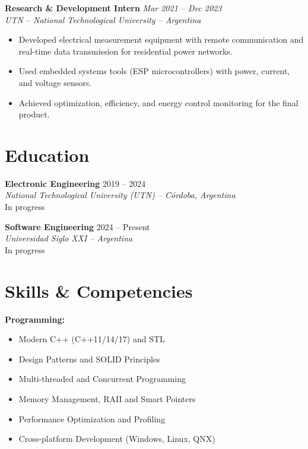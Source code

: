 \documentclass[11pt,a4paper]{article}
\newcommand{\resumeItem}[1]{\item #1}
\newcommand{\jobentry}[3]{%
    \noindent\textbf{#1} \hfill \textit{#2}\\
    \textit{#3}
}
\begin{document}
\jobentry{Research \& Development Intern}{Mar 2021 -- Dec 2023}{UTN -- National Technological University -- Argentina}
\begin{itemize}[leftmargin=*, nosep, topsep=4pt]
    \resumeItem{Developed electrical measurement equipment with remote communication and real-time data transmission for residential power networks.}
    \resumeItem{Used embedded systems tools (ESP microcontrollers) with power, current, and voltage sensors.}
    \resumeItem{Achieved optimization, efficiency, and energy control monitoring for the final product.}
\end{itemize}

\section{Education}

\noindent\textbf{Electronic Engineering} \hfill 2019 -- 2024\\
\textit{National Technological University (UTN) -- C\'{o}rdoba, Argentina}\\
In progress

\vspace{6pt}

\noindent\textbf{Software Engineering} \hfill 2024 -- Present\\
\textit{Universidad Siglo XXI -- Argentina}\\
In progress

\section{Skills \& Competencies}

\noindent\textbf{Programming:}
\begin{itemize}[leftmargin=*, nosep, topsep=2pt]
    \item Modern C++ (C++11/14/17) and STL
    \item Design Patterns and SOLID Principles
    \item Multi-threaded and Concurrent Programming
    \item Memory Management, RAII and Smart Pointers
    \item Performance Optimization and Profiling
    \item Cross-platform Development (Windows, Linux, QNX)
\end{itemize}

\vspace{4pt}
\end{document}
